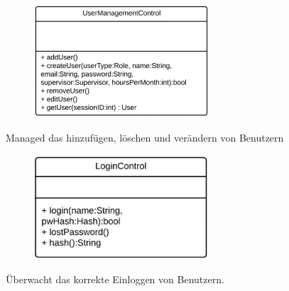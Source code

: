 \begin{itemize}
\begin{itemize}
                    \begin{figure}[htb]
                    \centering
                    \includegraphics[width=6.5cm]{Diagramms/class/singleclass/ControlUM.pdf}
                    \end{figure}
                        Managed das hinzufügen, löschen und verändern von Benutzern
                        \begin{itemize}
                        \end{itemize}

                    \begin{figure}[htb]
                    \centering
                    \includegraphics[width=6.5cm]{Diagramms/class/singleclass/ControlLogin.pdf}
                    \end{figure}
                    \newline
                        Überwacht das korrekte Einloggen von Benutzern.
                        \begin{itemize}
                        \end{itemize}


\end{itemize}
\end{itemize}
